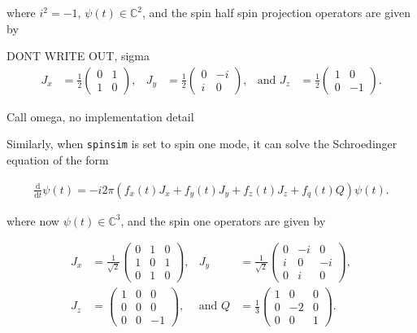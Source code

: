 \documentclass{jors}
\begin{document}
		where \(i^2 = -1\), \(\psi(t) \in \mathbb{C}^2\), and the spin half spin projection operators are given by


		DONT WRITE OUT, sigma
		\begin{align}
			J_x &= \frac12\begin{pmatrix}
				0 & 1 \\
				1 & 0
			\end{pmatrix},
			&J_y &= \frac12\begin{pmatrix}
				0 & -i \\
				i &  0
			\end{pmatrix},
			&\textrm{and }J_z &= \frac12\begin{pmatrix}
				1 &  0 \\
				0 & -1
			\end{pmatrix}.\label{eq:spin_half_operators}
		\end{align}

		Call omega, no implementation detail

		Similarly, when \texttt{spinsim} is set to spin one mode, it can solve the Schroedinger equation of the form

		\begin{align}
			\frac{\mathrm{d}}{\mathrm{d}t}\psi(t) = -i 2\pi (f_x(t) J_x + f_y(t) J_y + f_z(t) J_z + f_q(t) Q) \psi(t).
		\end{align}

		where now \(\psi(t) \in \mathbb{C}^3\), and the spin one operators are given by

		\begin{align}
			J_x &= \frac{1}{\sqrt{2}}\begin{pmatrix}
				0 & 1 & 0 \\
				1 & 0 & 1 \\
				0 & 1 & 0
			\end{pmatrix},&
			J_y &= \frac{1}{\sqrt{2}}\begin{pmatrix}
				0 & -i &  0 \\
				i &  0 & -i \\
				0 &  i &  0
			\end{pmatrix},\nonumber\\
			J_z &= \begin{pmatrix}
				1 & 0 &  0 \\
				0 & 0 &  0 \\
				0 & 0 & -1
			\end{pmatrix},&
			\textrm{and }Q &= \frac{1}{3}\begin{pmatrix}
				1 &  0 & 0 \\
				0 & -2 & 0 \\
				0 &  0 & 1
			\end{pmatrix}.\label{eq:spin_one_operators}
		\end{align}
\end{document}
